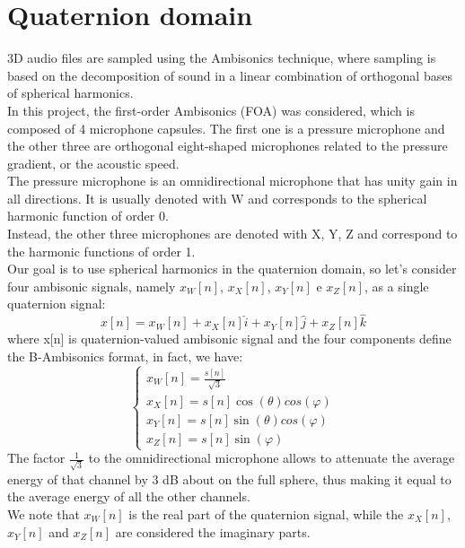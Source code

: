 \documentclass{article}
\begin{document}
    \section{Quaternion domain}
    3D audio files are sampled using the Ambisonics technique, where sampling is based on the decomposition of sound in a linear 
    combination of orthogonal bases of spherical harmonics.
    \\ In this project, the first-order Ambisonics (FOA) was considered, which is composed of 4 microphone capsules. The first one is a pressure microphone and the other three are orthogonal eight-shaped microphones related to the pressure gradient, or the acoustic
    speed.
    \\ The pressure microphone is an omnidirectional microphone that has unity gain in all directions. It is usually denoted with W and corresponds to the spherical harmonic function of order 0. \\
    Instead, the other three microphones are denoted with X, Y, Z and correspond to the harmonic functions of order 1.
    \\ Our goal is to use spherical harmonics in the quaternion domain, so let's consider four ambisonic signals, namely $x_W[n]$, 
    $x_X[n]$, $x_Y[n]$ e $x_Z[n]$, as a single quaternion signal:
    \begin{equation*}
        x[n]=x_W[n]+x_X[n]\hat{i}+x_Y[n]\hat{j}+x_Z[n]\hat{k}
    \end{equation*}
    where x[n] is quaternion-valued ambisonic signal and the four components define the B-Ambisonics format, in fact, we have:
    \begin{equation*}
        \begin{cases}
            x_W[n] = \frac{s[n]}{\sqrt{3}} \\
            x_X[n] = s[n] \cos(\theta) cos(\varphi) \\
            x_Y[n] = s[n] \sin(\theta) cos(\varphi) \\
            x_Z[n] = s[n] \sin(\varphi)
        \end{cases}
    \end{equation*}
    The factor $\frac{1}{\sqrt{3}}$ to the omnidirectional microphone allows to attenuate the average energy of that channel by 
    3 dB about on the full sphere, thus making it equal to the average energy of all the other channels.
    \\ We note that $x_W[n]$ is the real part of the quaternion signal, while the $x_X[n]$, $x_Y[n]$ and $x_Z[n]$ are 
    considered the imaginary parts.
\end{document}
